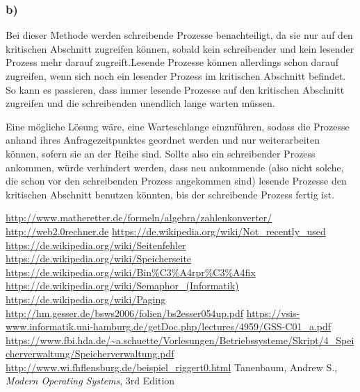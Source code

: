 \documentclass{article}
\begin{document}
\subsubsection*{b)}
Bei dieser Methode werden schreibende Prozesse benachteiligt, da sie nur auf den kritischen Abschnitt zugreifen können, sobald kein schreibender und kein lesender Prozess mehr darauf zugreift.Lesende Prozesse können 
allerdings schon darauf zugreifen, wenn sich noch ein lesender Prozess im kritischen Abschnitt befindet.
So kann es passieren, dass immer lesende Prozesse auf den kritischen Abschnitt zugreifen und die schreibenden unendlich lange warten müssen.

Eine mögliche Lösung wäre, eine Warteschlange einzuführen, sodass die Prozesse anhand ihres Anfragezeitpunktes geordnet werden und nur weiterarbeiten können, sofern sie an der Reihe sind.
Sollte also ein schreibender Prozess ankommen, würde verhindert werden, dass neu ankommende (also nicht solche, die schon vor den schreibenden Prozess angekommen sind) lesende Prozesse den kritischen Abschnitt benutzen könnten, bis der schreibende Prozess fertig ist. 
\begin{thebibliography}{1}
	\url{http://www.matheretter.de/formeln/algebra/zahlenkonverter/}
	\url{http://web2.0rechner.de}
	\url{https://de.wikipedia.org/wiki/Not\_recently\_used}
	\url{https://de.wikipedia.org/wiki/Seitenfehler}
	\url{https://de.wikipedia.org/wiki/Speicherseite}
	\url{https://de.wikipedia.org/wiki/Bin\%C3\%A4rpr\%C3\%A4fix}
	\url{https://de.wikipedia.org/wiki/Semaphor\_(Informatik)}
	\url{https://de.wikipedia.org/wiki/Paging}
	\url{http://hm.gesser.de/bsws2006/folien/bs2esser054up.pdf}
		\url{https://vsis-www.informatik.uni-hamburg.de/getDoc.php/lectures/4959/GSS-C01\_a.pdf}
		\url{https://www.fbi.hda.de/\~a.schuette/Vorlesungen/Betriebssysteme/Skript/4\_Speicherverwaltung/Speicherverwaltung.pdf}
		\url{http://www.wi.fhflensburg.de/beispiel\_riggert0.html}
 Tanenbaum, Andrew S., \textit{Modern Operating Systems}, 3rd Edition
\end{thebibliography}
\end{document}
